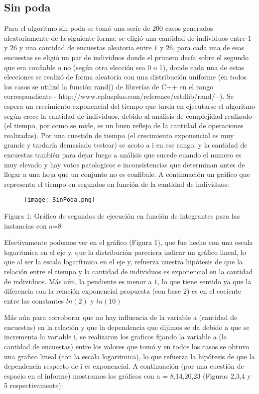 \documentclass[A4paper,oneside,fleqn,10pt]{article}
\theoremstyle{definition}
\begin{document}
\subsection{Sin poda}
Para el algoritmo sin poda se tomó una serie de $200$ casos generados aleatoriamente de la siguiente forma: se eligió una cantidad de individuos entre $1$ y $26$ y una cantidad de encuestas aleatoria entre $1$ y $26$, para cada una de esas encuestas se eligió un par de individuos donde el primero decía sobre el segundo que era confiable o no (según otra elección sea 0 o 1), donde cada una de estas elecciones se realizó de forma aleatoria con una distribución uniforme (en todos los casos se utilizó la función rand()  de librerías de C++ en el rango correspondiente - http://www.cplusplus.com/reference/cstdlib/rand/ -). Se espera un crecimiento exponencial del tiempo que tarda en ejecutarse el algoritmo según crece la cantidad de individuos, debido al análisis de complejidad realizado (el tiempo, por como se mide, es un buen reflejo de la cantidad de operaciones realizadas). Por una cuestión de tiempo (el crecimiento exponencial es muy grande y tardaría demasiado testear) se acoto a i en ese rango, y la cantidad de encuestas también para dejar luego a análisis que sucede cuando el numero es muy elevado y hay votos patologicos e inconsistencias que determinan antes de llegar a una hoja que un conjunto no es confibale. A continuación un gráfico que representa el tiempo en segundos en función de la cantidad de individuos:

\begin{figure}[h!]
  \texttt{[image: SinPoda.png]}
  \label{fig:boat1}
\end{figure}

\scriptsize
     Figura 1: Gráfico de segundos de ejecución en función de integrantes para las instancias con a=8

\normalsize
Efectivamente podemos ver en el gráfico (Figura 1), que fue hecho con una escala logaritmica en el eje y, que la distribución pareciera indicar un gráfico lineal, lo que al ser la escala logarítmica en el eje y, refuerza nuestra hipótesis de que la relación entre el tiempo y la cantidad de individuos es exponencial en la cantidad de individuos.  Más aún, la pendiente es menor a $1$, lo que tiene sentido ya que la diferencia con la relación exponencial propuesta (con base $2$) es en el cociente entre las constantes $ln(2)$ y $ln(10)$

Más aún para corroborar que no hay influencia de la variable a (cantidad de encuestas) en la relación y que la dependencia que dijimos se da debido a que se incrementa la variable i, se realizaron los graficos fijando la variable a (la cantidad de encuestas) entre los valores que tomó y en todos los casos se obtuvo una grafico lineal (con la escala logaritmica), lo que refuerza la hipótesis de que la dependencia respecto de i es exponencial. A continuación (por una cuestión de espacio en el informe) mostramos los gráficos con a = 8,14,20,23 (Figuras 2,3,4 y 5 respectivamente):
\end{document}
